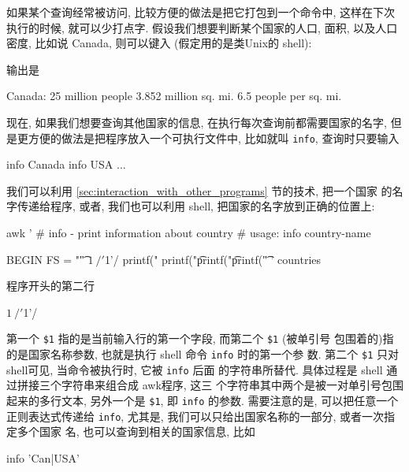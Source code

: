 如果某个查询经常被访问, 比较方便的做法是把它打包到一个命令中, 这样在下次
执行的时候, 就可以少打点字. 假设我们想要判断某个国家的人口, 面积, 以及人口 
密度, 比如说 Canada, 则可以键入 (假定用的是类Unix的 shell):
输出是 
\begin{shell}
    Canada:
        25 million people
        3.852 million sq. mi.
        6.5 people per sq. mi.
\end{shell}
现在, 如果我们想要查询其他国家的信息, 在执行每次查询前都需要国家的名字,
但是更方便的做法是把程序放入一个可执行文件中, 比如就叫 \verb'info',
查询时只要输入
\begin{awkcode}
    info Canada
    info USA
    ...
\end{awkcode}
我们可以利用 \ref{sec:interaction_with_other_programs} 节的技术, 把一个国家
的名字传递给程序, 或者, 我们也可以利用 shell, 把国家的名字放到正确的位置上:
\begin{awkcode}
    awk '
    # info - print information about country
    #    usage: info country-name

    BEGIN { FS = "\t" }
    $1 ~ /'$1'/ {
        printf("%
        printf("\t%
        printf("\t%
        printf("\t%
    }
    ' countries
\end{awkcode}
程序开头的第二行
\begin{awkcode}
    $1 ~ /'$1'/
\end{awkcode}
第一个 \verb'$1' 指的是当前输入行的第一个字段, 而第二个 \verb'$1' (被单引号
包围着的)指的是国家名称参数, 也就是执行 shell 命令 \verb'info' 时的第一个参
数. 第二个 \verb'$1' 只对shell可见, 当命令被执行时, 它被 \verb'info' 后面 
的字符串所替代. 具体过程是 shell 通过拼接三个字符串来组合成 awk程序, 这三 
个字符串其中两个是被一对单引号包围起来的多行文本, 另外一个是 \verb'$1',
即 \texttt{info} 的参数. 需要注意的是, 可以把任意一个正则表达式传递给
\texttt{info}, 尤其是, 我们可以只给出国家名称的一部分, 或者一次指定多个国家
名, 也可以查询到相关的国家信息, 比如 
\begin{awkcode}
    info 'Can|USA'
\end{awkcode}

